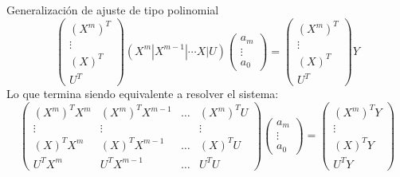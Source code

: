\begin{frame}{Generalización de ajuste  de tipo polinomial}
\begin{displaymath}
\left(
\begin{array}{c}
(X^m)^T\\
\vdots\\
(X)^T\\
U^T
\end{array}
\right)
(X^m|X^{m-1}|\cdots X|U)
\left(
\begin{array}{c}
a_m\\
\vdots\\
a_0
\end{array}
\right)=
\left(
\begin{array}{c}
(X^m)^T\\
\vdots\\
(X)^T\\
U^T
\end{array}
\right)
Y
\end{displaymath}
Lo que termina siendo equivalente a resolver el sistema:
\begin{displaymath}
\left(
\begin{array}{cccc}
(X^m)^TX^m & (X^m)^TX^{m-1} &\hdots & (X^m)^TU\\
\vdots&\vdots &&\vdots\\
(X)^TX^m&(X)^TX^{m-1}&\hdots &(X)^TU\\
U^TX^m&U^TX^{m-1}&\hdots &U^TU
\end{array}
\right)
\left(
\begin{array}{c}
a_m\\
\vdots\\
a_0
\end{array}
\right)=
\left(
\begin{array}{c}
(X^m)^TY\\
\vdots\\
(X)^TY\\
U^TY
\end{array}
\right)
\end{displaymath}
\end{frame}
